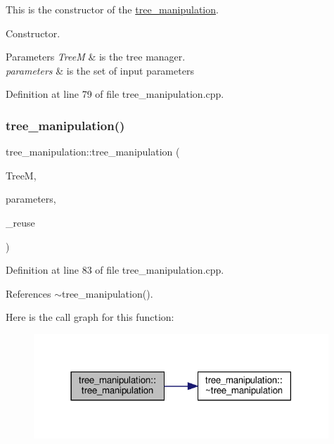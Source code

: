 This is the constructor of the \hyperlink{classtree__manipulation}{tree\+\_\+manipulation}. 

Constructor.


\begin{DoxyParams}{Parameters}
{\em TreeM} & is the tree manager. \\
\hline
{\em parameters} & is the set of input parameters \\
\hline
\end{DoxyParams}


Definition at line 79 of file tree\+\_\+manipulation.\+cpp.

\mbox{\label{classtree__manipulation_a3bd71cc78853ef105053e9d902ed0111}} 
\subsubsection{\texorpdfstring{tree\+\_\+manipulation()}{tree\_manipulation()}\hspace{0.1cm}{\footnotesize\ttfamily [2/2]}}
{\footnotesize\ttfamily tree\+\_\+manipulation\+::tree\+\_\+manipulation (\begin{DoxyParamCaption}\item[{const \hyperlink{tree__manager_8hpp_a96ff150c071ce11a9a7a1e40590f205e}{tree\+\_\+manager\+Ref} \&}]{TreeM,  }\item[{const \hyperlink{Parameter_8hpp_a37841774a6fcb479b597fdf8955eb4ea}{Parameter\+Const\+Ref} \&}]{parameters,  }\item[{bool}]{\+\_\+reuse }\end{DoxyParamCaption})}



Definition at line 83 of file tree\+\_\+manipulation.\+cpp.



References $\sim$tree\+\_\+manipulation().

Here is the call graph for this function\+:
\nopagebreak
\begin{figure}[H]
\begin{center}
\leavevmode
\includegraphics[width=314pt]{d0/d99/classtree__manipulation_a3bd71cc78853ef105053e9d902ed0111_cgraph}
\end{center}
\end{figure}
\mbox{\label{classtree__manipulation_a77557dd87ecad9255e0fa23178aead99}} 
